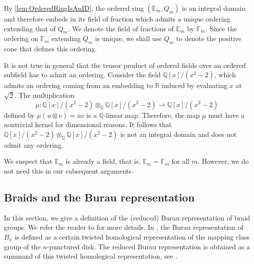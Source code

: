 \documentclass{amsart}
\begin{document}
By \cref{lem:OrderedRingIsAnID}, the ordered ring $(\mathbb{E}_m,Q_m)$ is an integral domain and therefore embeds in its field of fraction which admits a unique ordering extending that of $Q_m$. We denote the field of fractions of $\mathbb{E}_m$ by $\mathbb{F}_m$. Since the ordering on $\mathbb{F}_m$ extending $Q_m$ is unique, we shall use $Q_m$ to denote the positive cone that defines this ordering.  

\begin{remark}
    It is not true in general that the tensor product of ordered fields over an ordered subfield has to admit an ordering. Consider the field $\mathbb{Q}[x]/(x^2-2)$, which admits an ordering coming from an embedding to $\mathbb{R}$ induced by evaluating $x$ at $\sqrt{2}$. The multiplication 
    \[\mu : \mathbb{Q}[x]/(x^2-2) \otimes_\mathbb{Q}\mathbb{Q}[x]/(x^2-2) \to \mathbb{Q}[x]/(x^2-2)\] 
    defined by $\mu(u\otimes v) = uv$ is a $\mathbb{Q}$-linear map. Therefore, the map $\mu$ must have a nontrivial kernel for dimensional reasons. It follows that $\mathbb{Q}[x]/(x^2-2) \otimes_\mathbb{Q}\mathbb{Q}[x]/(x^2-2)$ is not an integral domain and does not admit any ordering. 
\end{remark}

\begin{remark}
    We suspect that $\mathbb{E}_m$ is already a field, that is, $\mathbb{E}_m = \mathbb{F}_m$ for all $m$. However, we do not need this in our subsequent arguments. 
\end{remark}



\subsection{Braids and the Burau representation}
In this section, we give a definition of the (reduced) Burau representation of braid groups. We refer the reader to \cite{kasselturaev08braid} for more details. In \cite[Section 3.2.2]{kasselturaev08braid}, the Burau representation of $B_n$ is defined as a certain twisted homological representation of the mapping class group of the $n$-punctured disk. The reduced Burau representation is obtained as a summand of this twisted homological representation, see \cite[Section 3.3]{kasselturaev08braid}. 
\end{document}
